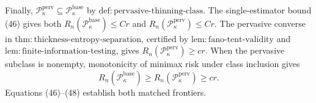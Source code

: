 Finally, \(\mathcal P_{\kappa}^{\mathrm{perv}}\subseteq\mathcal P_{\kappa}^{\mathrm{base}}\) by \(\mathrm{def:pervasive\text{-}thinning\text{-}class}\). The single-estimator bound (46) gives both \(R_n(\mathcal P_{\kappa}^{\mathrm{base}})\le Cr\) and \(R_n(\mathcal P_{\kappa}^{\mathrm{perv}})\le Cr\). The pervasive converse in \(\mathrm{thm:thickness\text{-}entropy\text{-}separation}\), certified by \(\mathrm{lem:fano\text{-}tent\text{-}validity}\) and \(\mathrm{lem:finite\text{-}information\text{-}testing}\), gives \(R_n(\mathcal P_{\kappa}^{\mathrm{perv}})\ge cr\). When the pervasive subclass is nonempty, monotonicity of minimax risk under class inclusion gives
\[
 R_n(\mathcal P_{\kappa}^{\mathrm{base}})
 \ge R_n(\mathcal P_{\kappa}^{\mathrm{perv}})\ge cr. \tag{48}
\]
Equations (46)--(48) establish both matched frontiers.